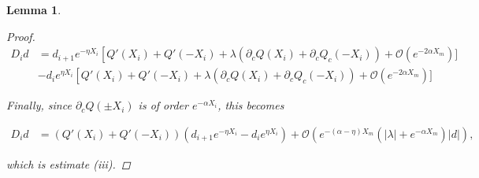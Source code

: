 \documentclass[12pt]{article}
\newtheorem{lemma}{Lemma}
\begin{document}
\begin{lemma}
\begin{proof}
\begin{align*}
D_i d &= d_{i+1} e^{-\eta X_i} \left[ Q'(X_i) + Q'(-X_i) + \lambda( \partial_c Q(X_i) + \partial_c Q_c(-X_i)) + \mathcal{O} \left( e^{-2 \alpha X_m} \right) ] \\
&- d_i e^{\eta X_i} \left[ Q'(X_i) + Q'(-X_i) + \lambda( \partial_c Q(X_i) + \partial_c Q_c(-X_i)) + \mathcal{O} \left( e^{-2 \alpha X_m} \right) ]
\end{align*}

Finally, since $\partial_c Q(\pm X_i)$ is of order $e^{-\alpha X_i}$, this becomes

\begin{align*}
D_i d &= ( Q'(X_i) + Q'(-X_i) )(d_{i+1} e^{-\eta X_i} - d_i e^{\eta X_i})
+ \mathcal{O} \left( e^{-(\alpha - \eta) X_m}\left( |\lambda| +  e^{-\alpha X_m} \right) |d| \right),
\end{align*}

which is estimate (iii).

\end{proof}
\end{lemma}



\end{document}
